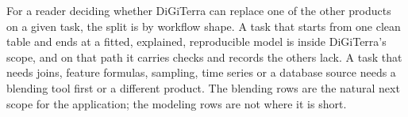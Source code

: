 For a reader deciding whether DiGiTerra can replace one of the other products on a given task, the split is by workflow shape. A task that starts from one clean table and ends at a fitted, explained, reproducible model is inside DiGiTerra's scope, and on that path it carries checks and records the others lack. A task that needs joins, feature formulas, sampling, time series or a database source needs a blending tool first or a different product. The blending rows are the natural next scope for the application; the modeling rows are not where it is short.
